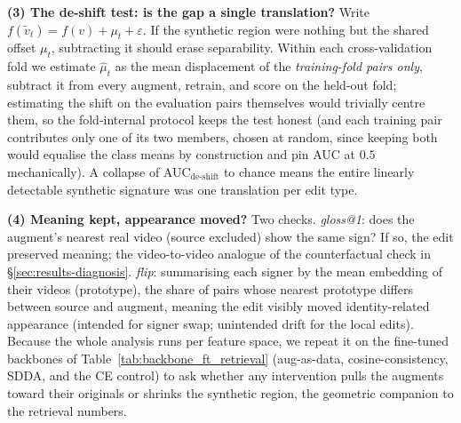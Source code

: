 \textbf{(3) The de-shift test: is the gap a single translation?} Write
$f(\tilde{v}_t)=f(v)+\mu_t+\varepsilon$. If the synthetic region were
nothing but the shared offset $\mu_t$, subtracting it should erase
separability. Within each cross-validation fold we estimate $\hat{\mu}_t$
as the mean displacement of the \emph{training-fold pairs only}, subtract
it from every augment, retrain, and score on the held-out fold;
estimating the shift on the evaluation pairs themselves would trivially
centre them, so the fold-internal protocol keeps the test honest (and
each training pair contributes only one of its two members, chosen at
random, since keeping both would equalise the class means by construction
and pin AUC at $0.5$ mechanically). A collapse of
AUC$_{\text{de-shift}}$ to chance means the entire linearly detectable
synthetic signature was one translation per edit type.

\textbf{(4) Meaning kept, appearance moved?}
Two checks. \emph{gloss@1}: does the augment's nearest real video
(source excluded) show the same sign? If so, the edit preserved meaning; the
video-to-video analogue of the counterfactual check in
\S\ref{sec:results-diagnosis}. \emph{flip}: summarising each signer by the
mean embedding of their videos (prototype), the share of pairs whose
nearest prototype differs between source and augment, meaning the edit visibly
moved identity-related appearance (intended for signer swap; unintended
drift for the local edits).
Because the whole analysis runs per feature space, we repeat it on the
fine-tuned backbones of Table~\ref{tab:backbone_ft_retrieval}
(aug-as-data, cosine-consistency, SDDA, and the CE control) to ask whether
any intervention pulls the augments toward their originals or shrinks the
synthetic region, the geometric companion to the retrieval numbers.

